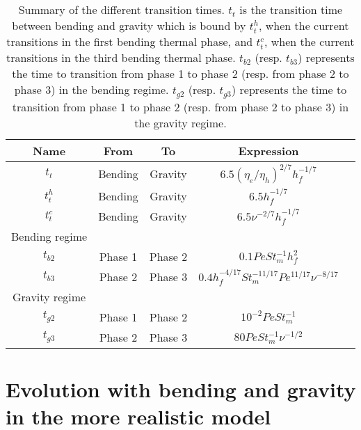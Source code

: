\begin{table}[h!]
  \begin{center}
    \begin{tabular}{c|cc|cc}
      Name&From&To&Expression\\
      \hline
      $t_t$&Bending&Gravity&$6.5(\eta_e/\eta_h)^{2/7}h_f^{-1/7}$\\
      $t_t^h$&Bending&Gravity&$6.5h_f^{-1/7}$\\
      $t_t^c$&Bending&Gravity&$6.5\nu^{-2/7}h_f^{-1/7}$\\
      Bending regime&\multicolumn{2}{c}{}& \\
      $t_{b2}$&Phase 1& Phase 2&$0.1 Pe St_m^{-1} h_f^2$\\
      $t_{b3}$&Phase 2& Phase 3 &$0.4 h_f^{-4/17} St_m^{-11/17}Pe^{11/17}\nu^{-8/17}$\\
      Gravity regime&\multicolumn{3}{c}{} \\
      $t_{g2}$ &Phase 1& Phase 2 &$10^{-2}PeSt_m^{-1}$\\
      $t_{g3}$ &Phase 2& Phase 3 &$ 80Pe St_m^{-1}\nu^{-1/2}$\\
    \end{tabular}
    \caption{Summary of the different  transition times.  $t_t$ is the
      transition time  between bending and  gravity which is  bound by
      $t_t^h$,  when  the current  transitions  in  the first  bending
      thermal phase, and $t_t^c$, when  the current transitions in the
      third  bending   thermal  phase.   $t_{b2}$   (resp.   $t_{b3}$)
      represents  the time  to  transition  from phase  1  to phase  2
      (resp. from phase 2 to phase  3) in the bending regime. $t_{g2}$
      (resp. $t_{g3}$) represents the time  to transition from phase 1
      to  phase 2  (resp. from  phase  2 to  phase 3)  in the  gravity
      regime. }
    \label{tab:TimeTransition}
  \end{center}
\end{table}
\section{Evolution  with bending  and  gravity in  the more  realistic
  model}
\label{C4-sec:evol-with-bend}

